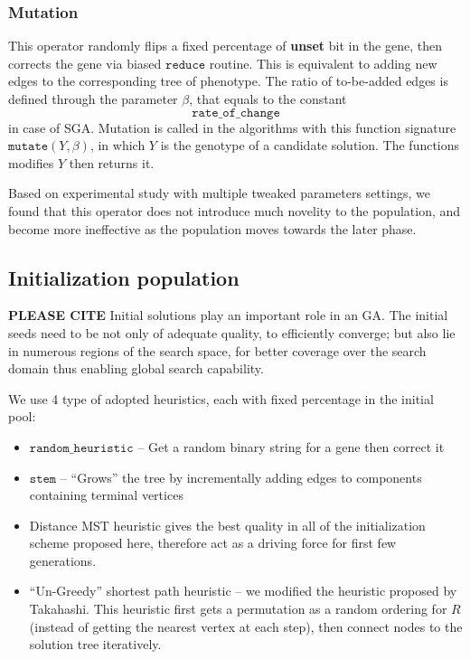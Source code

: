 \documentclass[runningheads]{llncs}
\begin{document}
\subsubsection*{Mutation}
This operator randomly flips a fixed percentage of \textbf{unset} bit in the gene, then corrects the gene via biased $\texttt{reduce}$ routine. This is equivalent to adding new edges to the corresponding tree of phenotype. The ratio of to-be-added edges is defined through the parameter $\beta$, that equals to the constant $$\texttt{rate\_of\_change}$$ in case of SGA. Mutation is called in the algorithms with this function signature $\texttt{mutate}(Y,\beta)$, in which $Y$ is the genotype of a candidate solution. The functions modifies $Y$ then returns it.

Based on experimental study with multiple tweaked parameters settings, we found that this operator does not introduce much novelity to the population, and become more ineffective as the population moves towards the later phase. 
\subsection{Initialization population}
\textbf{PLEASE CITE} Initial solutions play an important role in an GA. The initial seeds need to be not only of adequate quality, to efficiently converge; but also lie in numerous regions of the search space, for better coverage over the search domain thus enabling global search capability.

We use 4 type of adopted heuristics, each with fixed percentage in the initial pool:
\begin{itemize}
    \item $\texttt{random\_heuristic}$ -- Get a random binary string for a gene then correct it
    \item $\texttt{stem}$ -- ``Grows'' the tree by incrementally adding edges to components containing terminal vertices
    \item Distance MST heuristic \cite{kou1981fast} gives the best quality in all of the initialization scheme proposed here, therefore act as a driving force for first few generations.
    \item ``Un-Greedy'' shortest path heuristic \cite{takahashi1980approximate} -- we modified the heuristic proposed by Takahashi. This heuristic first gets a permutation as a random ordering for $R$ (instead of getting the nearest vertex at each step), then connect nodes to the solution tree iteratively. 
\end{itemize}
\end{document}
